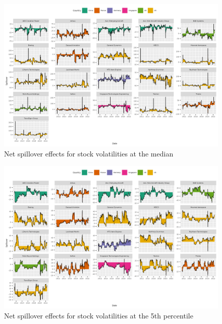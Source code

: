 \documentclass[
  letterpaper,
  DIV=11,
  numbers=noendperiod]{scrartcl}
\begin{document}
\begin{figure}[H]

{\centering \includegraphics{plots/fig-volnet50.png}

}

\caption{\label{fig-volnet50}Net spillover effects for stock
volatilities at the median}

\end{figure}

\begin{figure}[H]

{\centering \includegraphics{plots/fig-volnet5.png}

}

\caption{\label{fig-volnet5}Net spillover effects for stock volatilities
at the 5th percentile}

\end{figure}
\end{document}
